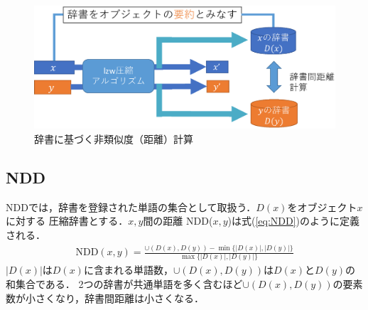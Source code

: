 \begin{figure}[tb]
\begin{center}
\includegraphics[clip, width=\columnwidth]{image/Create_dictionary.eps}
\caption{辞書に基づく非類似度（距離）計算}
\label{fig:image/Create_dictionary.eps}
\end{center}
\end{figure}








\subsection{NDD} %
\label{sub:ndd}
NDDでは，辞書を登録された単語の集合として取扱う．$D(x)$をオブジェクト$x$に対する
圧縮辞書とする．$x,y$間の距離 NDD($x,y$)は式(\ref{eq:NDD})のように定義される．
\begin{eqnarray}
\mathrm{NDD}(x,y) = \frac{ \cup(D(x),D(y)) - \min\{|D(x)|,|D(y)|\} }{ \max\{|D(x)|,|D(y)|\} }
\label{eq:NDD}
\end{eqnarray}
$|D(x)|$は$D(x)$に含まれる単語数，$\cup(D(x),D(y))$は$D(x)$と$D(y)$の和集合である．
2つの辞書が共通単語を多く含むほど$\cup(D(x),D(y))$の要素数が小さくなり，辞書間距離は小さくなる．

